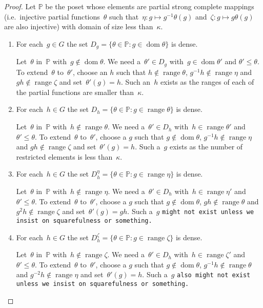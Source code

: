 \documentclass[12pt,a4paper]{article}
\DeclareMathOperator{\dom}{dom}
\DeclareMathOperator{\ran}{range}
\renewcommand{\P}{\mathbb{P}}
\begin{document}
\begin{proof}

Let $\P$ be the poset whose elements are partial strong complete mappings (i.e.~injective partial functions~$\theta$ such that~$\eta: g \mapsto g^{-1}\theta(g)$ and~$\zeta: g \mapsto g\theta(g)$ are also injective) with domain of size less than~$\kappa$.



\begin{enumerate}

\item For each~$g \in G$ the set  $D_g = \{ \theta \in \P : g \in \dom \theta \}$ is dense.

Let~$\theta$ in~$\P$ with~$g \not\in \dom \theta$.  We need a~$\theta' \in D_g$ with~$g \in \dom \theta'$ and $\theta' \leq \theta$.  To extend~$\theta$ to~$\theta'$, choose an $h$ such that $h \not\in \ran \theta$, $g^{-1}h \not\in \ran \eta$ and $gh \not\in \ran \zeta$ and set~$\theta'(g) = h$.  Such an~$h$ exists as the ranges of each of the partial functions are smaller than~$\kappa$.


\item For each~$h \in G$ the set  $D_h = \{ \theta \in \P : g \in \ran \theta \}$ is dense.

Let~$\theta$ in~$\P$ with~$h \not\in \ran \theta$.  We need a~$\theta' \in D_h$ with~$h \in \ran \theta'$ and $\theta' \leq \theta$.
To extend~$\theta$ to~$\theta'$,  choose a $g$ such that $g \not\in \dom \theta$, $g^{-1}h \not\in \ran \eta$ and $gh \not\in \ran \zeta$ and set~$\theta'(g) = h$.  Such a~$g$ exists as the number of restricted elements is less than~$\kappa$.


\item For each~$h \in G$ the set  $D_h^{\eta} = \{ \theta \in \P : g \in \ran \eta \}$ is dense.

Let~$\theta$ in~$\P$ with~$h \not\in \ran \eta$.  We need a~$\theta' \in D_h$ with~$h \in \ran \eta'$ and $\theta' \leq \theta$.
To extend~$\theta$ to~$\theta'$,  choose a $g$ such that $g \not\in \dom \theta$, $gh \not\in \ran \theta$ and $g^2h \not\in \ran \zeta$ and set~$\theta'(g) = gh$.  Such a~$g$ \texttt{might not exist unless we insist on squarefulness or something.}


\item For each~$h \in G$ the set  $D_h^{\zeta} = \{ \theta \in \P : g \in \ran \zeta \}$ is dense.

Let~$\theta$ in~$\P$ with~$h \not\in \ran \zeta$.  We need a~$\theta' \in D_h$ with~$h \in \ran \zeta'$ and $\theta' \leq \theta$.
To extend~$\theta$ to~$\theta'$,  choose a $g$ such that $g \not\in \dom \theta$, $g^{-1}h \not\in \ran \theta$ and $g^{-2}h \not\in \ran \eta$ and set~$\theta'(g) = h$.  Such a~$g$ \texttt{also might not exist unless we insist on squarefulness or something.}




\end{enumerate}

\end{proof}
\end{document}
